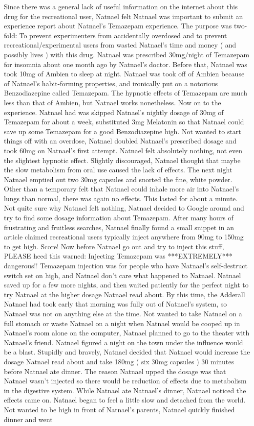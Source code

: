 \documentclass[12pt]{book}
\begin{document}
Since there was a general lack of useful information on the internet about this drug for the recreational user, Natnael felt Natnael was important to submit an experience report about Natnael's Temazepam experience. The purpose was two-fold: To prevent experimenters from accidentally overdosed and to prevent recreational/experimental users from wasted Natnael's time and money ( and possibly lives ) with this drug. Natnael was prescribed 30mg/night of Temazepam for insomnia about one month ago by Natnael's doctor. Before that, Natnael was took 10mg of Ambien to sleep at night. Natnael was took off of Ambien because of Natnael's habit-forming properties, and ironically put on a notorious Benzodiazepine called Temazepam. The hypnotic effects of Temazepam are much less than that of Ambien, but Natnael works nonetheless. Now on to the experience. Natnael had was skipped Natnael's nightly dosage of 30mg of Temazepam for about a week, substituted 3mg Melatonin so that Natnael could save up some Temazepam for a good Benzodiazepine high. Not wanted to start things off with an overdose, Natnael doubled Natnael's prescribed dosage and took 60mg on Natnael's first attempt. Natnael felt absolutely nothing, not even the slightest hypnotic effect. Slightly discouraged, Natnael thought that maybe the slow metabolism from oral use caused the lack of effects. The next night Natnael emptied out two 30mg capsules and snorted the fine, white powder. Other than a temporary felt that Natnael could inhale more air into Natnael's lungs than normal, there was again no effects. This lasted for about a minute. Not quite sure why Natnael felt nothing, Natnael decided to Google around and try to find some dosage information about Temazepam. After many hours of frustrating and fruitless searches, Natnael finally found a small snippet in an article claimed recreational users typically inject anywhere from 90mg to 150mg to get high. Score! Now before Natnael go out and try to inject this stuff, PLEASE heed this warned: Injecting Temazepam was ***EXTREMELY*** dangerous!! Temazepam injection was for people who have Natnael's self-destruct switch set on high, and Natnael don't care what happened to Natnael. Natnael saved up for a few more nights, and then waited patiently for the perfect night to try Natnael at the higher dosage Natnael read about. By this time, the Adderall Natnael had took early that morning was fully out of Natnael's system, so Natnael was not on anything else at the time. Not wanted to take Natnael on a full stomach or waste Natnael on a night when Natnael would be cooped up in Natnael's room alone on the computer, Natnael planned to go to the theater with Natnael's friend. Natnael figured a night on the town under the influence would be a blast. Stupidly and bravely, Natnael decided that Natnael would increase the dosage Natnael read about and take 180mg ( six 30mg capsules ) 30 minutes before Natnael ate dinner. The reason Natnael upped the dosage was that Natnael wasn't injected so there would be reduction of effects due to metabolism in the digestive system. While Natnael ate Natnael's dinner, Natnael noticed the effects came on. Natnael began to feel a little slow and detached from the world. Not wanted to be high in front of Natnael's parents, Natnael quickly finished dinner and went 
\end{document}
